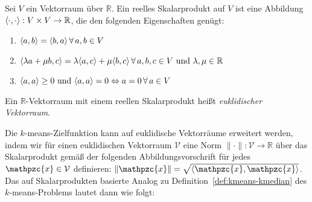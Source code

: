 \begin{definition}
\label{def:innerproductspace}
	Sei $V$ ein Vektorraum über $\mathbb{R}$. Ein reelles Skalarprodukt auf $V$ ist eine Abbildung
	$\langle \cdot, \cdot \rangle : V \times V \rightarrow \mathbb{R}$, die den folgenden Eigenschaften genügt:
	\begin{enumerate}
		\item 	$\langle a, b \rangle = \langle b, a \rangle \, \forall \, a, b \in V$
		\item 	$\langle \lambda a + \mu b, c \rangle = \lambda \langle a, c \rangle + \mu \langle b, c \rangle \,
				\forall \, a,b,c \in V \textrm{ und } \lambda, \mu \in \mathbb{R}$
		\item 	$\langle a, a \rangle \geq 0 \textrm{ und } \langle a, a \rangle = 0 \Leftrightarrow a = 0 \, \forall \, a \in V$
	\end{enumerate}
	Ein $\mathbb{R}$-Vektorraum mit einem reellen Skalarprodukt heißt \emph{euklidischer Vektorraum}.
\end{definition}
Die $k$-means-Zielfunktion kann auf euklidische Vektorräume erweitert werden, indem wir für einen euklidischen Vektorraum
$\mathcal{V}$ eine Norm $\lVert \cdot \rVert : \mathcal{V} \rightarrow \mathbb{R}$ über das Skalarprodukt gemäß der folgenden
Abbildungsvorschrift für jedes $\mathpzc{x} \in \mathcal{V}$ definieren:
$\lVert \mathpzc{x} \rVert = \sqrt{\innerproduct{\mathpzc{x}}{\mathpzc{x}}}$.
Das auf Skalarprodukten basierte Analog zu Definition~\ref{def:kmeans-kmedian} des $k$-means-Problems lautet dann wie folgt:

